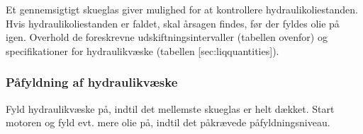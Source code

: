 Et gennemsigtigt skueglas giver mulighed for at kontrollere hydraulikoliestanden.
Hvis hydraulikoliestanden er faldet, skal årsagen findes, før der fyldes olie på igen. Overhold de foreskrevne udskiftningsintervaller (tabellen ovenfor) og specifikationer for hydraulikvæske (tabellen [sec:liqquantities]).


\subsubsection{Påfyldning af hydraulikvæske}

Fyld hydraulikvæske på, indtil det mellemste skueglas er helt dækket.
Start motoren og fyld evt. mere olie på, indtil det påkrævede påfyldningsniveau.
